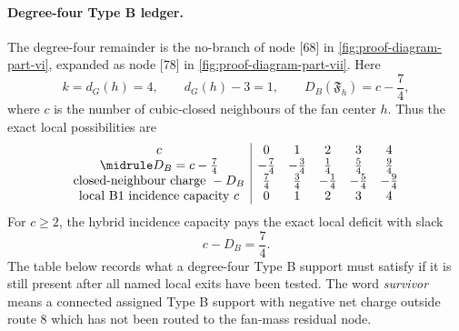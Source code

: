 \documentclass[11pt]{article}
\begin{document}
\paragraph{Degree-four Type B ledger.}
The degree-four remainder is the no-branch of node [68] in
\cref{fig:proof-diagram-part-vi}, expanded as node [78] in
\cref{fig:proof-diagram-part-vii}.  Here
\[
k=d_G(h)=4,\qquad d_G(h)-3=1,\qquad
D_B(\mathfrak F_h)=c-\frac{7}{4},
\]
where \(c\) is the number of cubic-closed neighbours of the fan center \(h\).
Thus the exact local possibilities are
\[
\begin{array}{c|ccccc}
c&0&1&2&3&4\\
\midrule
D_B=c-\frac74&-\frac74&-\frac34&\frac14&\frac54&\frac94\\
\text{closed-neighbour charge }-D_B&
\frac74&\frac34&-\frac14&-\frac54&-\frac94\\
\text{local B1 incidence capacity }c&
0&1&2&3&4
\end{array}
\]
For \(c\ge2\), the hybrid incidence capacity pays the exact local deficit with
slack
\[
c-D_B=\frac74 .
\]
The table below records what a degree-four Type B support must satisfy if it is
still present after all named local exits have been tested.  The word
\emph{survivor} means a connected assigned Type B support with negative net
charge outside route 8 which has not been routed to the fan-mass residual node.
\end{document}
